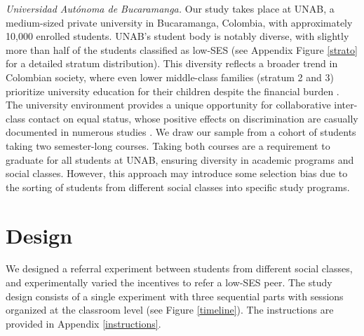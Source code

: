 \documentclass[11pt,a4paper,oneside]{article}
\begin{document}
\textit{Universidad Autónoma de Bucaramanga.}  Our study takes place at UNAB, a medium-sized private university in Bucaramanga, Colombia, with approximately 10,000 enrolled students. UNAB's student body is notably diverse, with slightly more than half of the students classified as low-SES (see Appendix Figure \ref{strato} for a detailed stratum distribution). This diversity reflects a broader trend in Colombian society, where even lower middle-class families (stratum 2 and 3) prioritize university education for their children despite the financial burden \citep[p. 103]{hudson_colombia_2010}. The university environment provides a unique opportunity for collaborative inter-class contact on equal status, whose positive effects on discrimination are casually documented in numerous studies \citep{rao2019familiarity, mousa2020building,lowe2021types}. We draw our sample from a cohort of students taking two semester-long courses. Taking both courses are a requirement to graduate for all students at UNAB, ensuring diversity in academic programs and social classes. However, this approach may introduce some selection bias due to the sorting of students from different social classes into specific study programs.



\section{Design}
We designed a referral experiment between students from different social classes, and experimentally varied the incentives to refer a low-SES peer. The study design consists of a single experiment with three sequential parts with sessions organized at the classroom level (see Figure \ref{timeline}). The instructions are provided in Appendix \ref{instructions}. 
\end{document}
